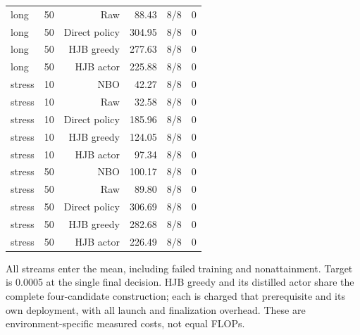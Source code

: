 \begin{longtable}{lrrrrr}
long & 50 & Raw & 88.43 & 8/8 & 0 \\
long & 50 & Direct policy & 304.95 & 8/8 & 0 \\
long & 50 & HJB greedy & 277.63 & 8/8 & 0 \\
long & 50 & HJB actor & 225.88 & 8/8 & 0 \\
stress & 10 & NBO & 42.27 & 8/8 & 0 \\
stress & 10 & Raw & 32.58 & 8/8 & 0 \\
stress & 10 & Direct policy & 185.96 & 8/8 & 0 \\
stress & 10 & HJB greedy & 124.05 & 8/8 & 0 \\
stress & 10 & HJB actor & 97.34 & 8/8 & 0 \\
stress & 50 & NBO & 100.17 & 8/8 & 0 \\
stress & 50 & Raw & 89.80 & 8/8 & 0 \\
stress & 50 & Direct policy & 306.69 & 8/8 & 0 \\
stress & 50 & HJB greedy & 282.68 & 8/8 & 0 \\
stress & 50 & HJB actor & 226.49 & 8/8 & 0 \\
\bottomrule
\end{longtable}
\par\medskip\noindent\footnotesize All streams enter the mean, including failed training and nonattainment. Target is 0.0005 at the single final decision. HJB greedy and its distilled actor share the complete four-candidate construction; each is charged that prerequisite and its own deployment, with all launch and finalization overhead. These are environment-specific measured costs, not equal FLOPs.
\endgroup
